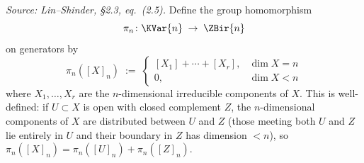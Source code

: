 \begin{definition}[Projection \(\pi_n\)]
  \label{def:pi-n}
  \textit{Source: Lin--Shinder, §2.3, eq.~(2.5).}
  Define the group homomorphism
  \[
    \pi_n \colon \KVar{n} \;\to\; \ZBir{n}
  \]
  on generators by
  \[
    \pi_n([X]_n) \;:=\;
    \begin{cases}
      [X_1] + \cdots + [X_r], & \dim X = n \\
      0, & \dim X < n
    \end{cases}
  \]
  where \(X_1, \ldots, X_r\) are the \(n\)-dimensional irreducible components of
  \(X\).  This is well-defined: if \(U \subset X\) is open with closed complement
  \(Z\), the \(n\)-dimensional components of \(X\) are distributed between \(U\) and
  \(Z\) (those meeting both \(U\) and \(Z\) lie entirely in \(U\) and their boundary
  in \(Z\) has dimension \(< n\)), so \(\pi_n([X]_n) = \pi_n([U]_n) + \pi_n([Z]_n)\).
\end{definition}

